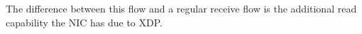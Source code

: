 The difference between this flow and a regular receive flow is the additional read capability the NIC has due to XDP.

